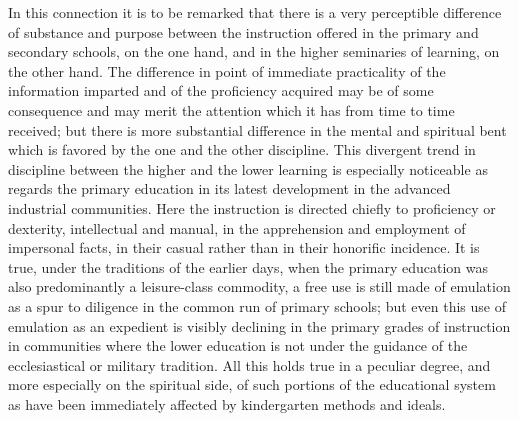 \documentclass[12pt]{report}
\begin{document}
In this connection it is to be remarked that there is a very perceptible
difference of substance and purpose between the instruction offered in
the primary and secondary schools, on the one hand, and in the higher
seminaries of learning, on the other hand. The difference in point
of immediate practicality of the information imparted and of the
proficiency acquired may be of some consequence and may merit the
attention which it has from time to time received; but there is more
substantial difference in the mental and spiritual bent which is favored
by the one and the other discipline. This divergent trend in discipline
between the higher and the lower learning is especially noticeable as
regards the primary education in its latest development in the advanced
industrial communities. Here the instruction is directed chiefly to
proficiency or dexterity, intellectual and manual, in the apprehension
and employment of impersonal facts, in their casual rather than in their
honorific incidence. It is true, under the traditions of the earlier
days, when the primary education was also predominantly a leisure-class
commodity, a free use is still made of emulation as a spur to diligence
in the common run of primary schools; but even this use of emulation as
an expedient is visibly declining in the primary grades of instruction
in communities where the lower education is not under the guidance
of the ecclesiastical or military tradition. All this holds true in
a peculiar degree, and more especially on the spiritual side, of such
portions of the educational system as have been immediately affected by
kindergarten methods and ideals.
\end{document}

